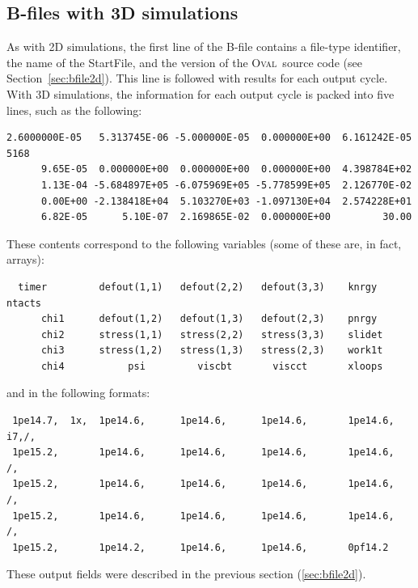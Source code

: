 \documentclass[letterpaper,11pt]{article}
\newcommand{\Oval}{\textsc{Oval}}
\begin{document}
\subsection{B-files with 3D simulations}\label{sec:bfiles3d}
As with 2D simulations,
the first line of the B-file
contains a file-type identifier, the name of the \textsf{StartFile},
and the version of the \Oval\ source code
(see Section~\ref{sec:bfile2d}).
This line is followed with results for each output cycle.
With 3D simulations, the information for each output cycle is packed
into five lines, such as the following:
\par
\footnotesize
\begin{verbatim}
2.6000000E-05   5.313745E-06 -5.000000E-05  0.000000E+00  6.161242E-05   5168
      9.65E-05  0.000000E+00  0.000000E+00  0.000000E+00  4.398784E+02
      1.13E-04 -5.684897E+05 -6.075969E+05 -5.778599E+05  2.126770E-02
      0.00E+00 -2.138418E+04  5.103270E+03 -1.097130E+04  2.574228E+01
      6.82E-05      5.10E-07  2.169865E-02  0.000000E+00         30.00
\end{verbatim}
\normalsize
\par
These contents correspond to the following variables (some of these
are, in fact, arrays):
\footnotesize
\begin{verbatim}
  timer         defout(1,1)   defout(2,2)   defout(3,3)    knrgy       ntacts
      chi1      defout(1,2)   defout(1,3)   defout(2,3)    pnrgy
      chi2      stress(1,1)   stress(2,2)   stress(3,3)    slidet
      chi3      stress(1,2)   stress(1,3)   stress(2,3)    work1t
      chi4           psi         viscbt       viscct       xloops
\end{verbatim}
\normalsize
and in the following formats:
\footnotesize
\begin{verbatim}
 1pe14.7,  1x,  1pe14.6,      1pe14.6,      1pe14.6,       1pe14.6,       i7,/,
 1pe15.2,       1pe14.6,      1pe14.6,      1pe14.6,       1pe14.6,          /,
 1pe15.2,       1pe14.6,      1pe14.6,      1pe14.6,       1pe14.6,          /,
 1pe15.2,       1pe14.6,      1pe14.6,      1pe14.6,       1pe14.6,          /,
 1pe15.2,       1pe14.2,      1pe14.6,      1pe14.6,       0pf14.2
\end{verbatim}
\normalsize
\par
These output fields were described in the previous section
(\ref{sec:bfile2d}).
%
\end{document}
